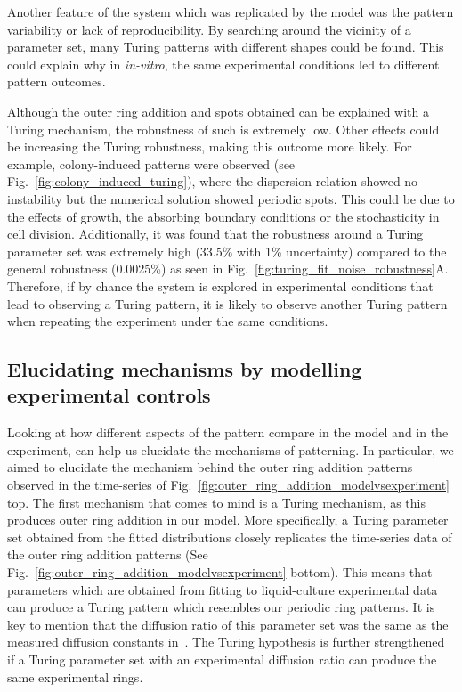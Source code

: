 Another feature of the system which was replicated by the model was the pattern variability or lack of reproducibility.
By searching around the vicinity of a parameter set, many Turing patterns with different shapes could be found.
This could explain why in \textit{in-vitro}, the same experimental conditions led to different pattern outcomes.

Although the outer ring addition and spots obtained can be explained with a Turing mechanism, the robustness of such is extremely low.
Other effects could be increasing the Turing robustness, making this outcome more likely.
For example, colony-induced patterns were observed (see Fig.~\ref{fig:colony_induced_turing}), where the dispersion relation showed no instability but the numerical solution showed periodic spots.
This could be due to the effects of growth, the absorbing boundary conditions or the stochasticity in cell division.
Additionally, it was found that the robustness around a Turing parameter set was extremely high (33.5\% with 1\% uncertainty) compared to the general robustness (0.0025\%) as seen in Fig.~\ref{fig:turing_fit_noise_robustness}A.
Therefore, if by chance the system is explored in experimental conditions that lead to observing a Turing pattern, it is likely to observe another Turing pattern when repeating the experiment under the same conditions.

\subsection{Elucidating mechanisms by modelling experimental controls}
Looking at how different aspects of the pattern compare in the model and in the experiment, can help us elucidate the mechanisms of patterning.
In particular, we aimed to elucidate the mechanism behind the outer ring addition patterns observed in the time-series of Fig.~\ref{fig:outer_ring_addition_modelvsexperiment} top.
The first mechanism that comes to mind is a Turing mechanism, as this produces outer ring addition in our model.
More specifically, a Turing parameter set obtained from the fitted distributions closely replicates the time-series data of the outer ring addition patterns (See Fig.~\ref{fig:outer_ring_addition_modelvsexperiment} bottom).
This means that parameters which are obtained from fitting to liquid-culture experimental data can produce a Turing pattern which resembles our periodic ring patterns.
It is key to mention that the diffusion ratio of this parameter set was the same as the measured diffusion constants in~\cite{tica_diffusers}.
The Turing hypothesis is further strengthened if a Turing parameter set with an experimental diffusion ratio can produce the same experimental rings.


